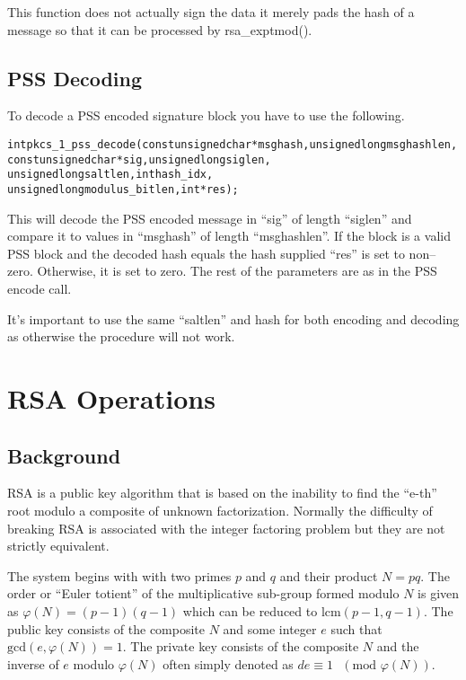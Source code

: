 \documentclass[a4paper]{book}
\def\phi{\varphi}
\begin{document}
This function does not actually sign the data it merely pads the hash of a message so that it can be processed by rsa\_exptmod().

\subsection{PSS Decoding}

To decode a PSS encoded signature block you have to use the following.

\begin{alltt}
int pkcs_1_pss_decode(const unsigned char *msghash, unsigned long msghashlen,
                      const unsigned char *sig,     unsigned long siglen,
                            unsigned long saltlen,  int           hash_idx,
                            unsigned long modulus_bitlen, int    *res);
\end{alltt}
This will decode the PSS encoded message in ``sig'' of length ``siglen'' and compare it to values in ``msghash'' of length
``msghashlen''.  If the block is a valid PSS block and the decoded hash equals the hash supplied ``res'' is set to non--zero.  Otherwise, 
it is set to zero.  The rest of the parameters are as in the PSS encode call.

It's important to use the same ``saltlen'' and hash for both encoding and decoding as otherwise the procedure will not work.

\section{RSA Operations}
\subsection{Background}

RSA is a public key algorithm that is based on the inability to find the ``e-th'' root modulo a composite of unknown 
factorization.  Normally the difficulty of breaking RSA is associated with the integer factoring problem but they are
not strictly equivalent.

The system begins with with two primes $p$ and $q$ and their product $N = pq$.  The order or ``Euler totient'' of the
multiplicative sub-group formed modulo $N$ is given as $\phi(N) = (p - 1)(q - 1)$ which can be reduced to 
$\mbox{lcm}(p - 1, q - 1)$.  The public key consists of the composite $N$ and some integer $e$ such that 
$\mbox{gcd}(e, \phi(N)) = 1$.  The private key consists of the composite $N$ and the inverse of $e$ modulo $\phi(N)$ 
often simply denoted as $de \equiv 1\mbox{ }(\mbox{mod }\phi(N))$.
\end{document}
